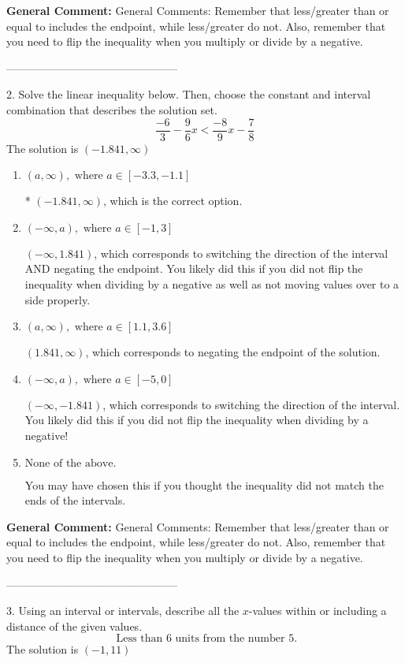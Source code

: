 \documentclass{extbook}[14pt]
\begin{document}
\textbf{General Comment:} General Comments: Remember that less/greater than or equal to includes the endpoint, while less/greater do not. Also, remember that you need to flip the inequality when you multiply or divide by a negative. 

-----------------------------------------------

2. Solve the linear inequality below. Then, choose the constant and interval combination that describes the solution set.
\[ \frac{-6}{3} - \frac{9}{6} x < \frac{-8}{9} x - \frac{7}{8} \] 
The solution is $ (-1.841, \infty) $ 

\begin{enumerate}[label=\Alph*.] 
\item $ (a, \infty), \text{ where } a \in [-3.3, -1.1] $ 

 * $(-1.841, \infty)$, which is the correct option. 
\item $ (-\infty, a), \text{ where } a \in [-1, 3] $ 

  $(-\infty, 1.841)$, which corresponds to switching the direction of the interval AND negating the endpoint. You likely did this if you did not flip the inequality when dividing by a negative as well as not moving values over to a side properly. 
\item $ (a, \infty), \text{ where } a \in [1.1, 3.6] $ 

  $(1.841, \infty)$, which corresponds to negating the endpoint of the solution. 
\item $ (-\infty, a), \text{ where } a \in [-5, 0] $ 

  $(-\infty, -1.841)$, which corresponds to switching the direction of the interval. You likely did this if you did not flip the inequality when dividing by a negative! 
\item $ \text{None of the above}. $ 

 You may have chosen this if you thought the inequality did not match the ends of the intervals. 
\end{enumerate} 
 
\textbf{General Comment:} General Comments: Remember that less/greater than or equal to includes the endpoint, while less/greater do not. Also, remember that you need to flip the inequality when you multiply or divide by a negative. 

-----------------------------------------------

3. Using an interval or intervals, describe all the $x$-values within or including a distance of the given values.
\[ \text{ Less than } 6 \text{ units from the number } 5. \] 
The solution is $ (-1, 11) $ 
\end{document}
